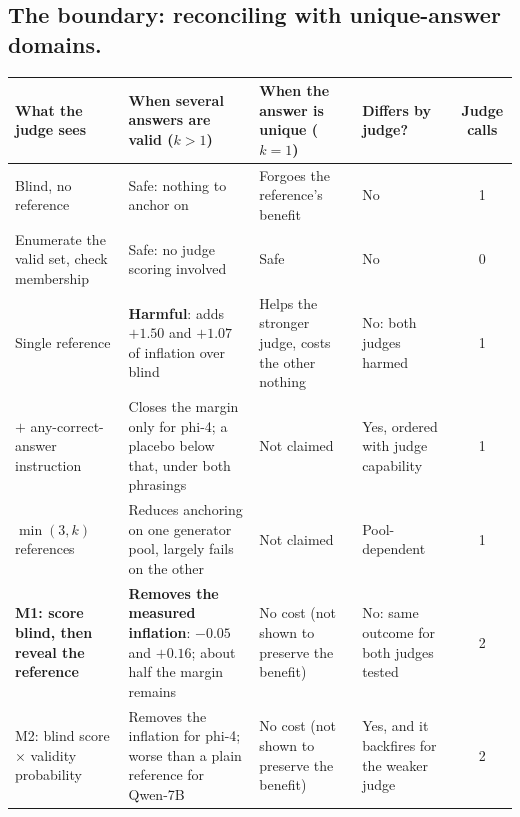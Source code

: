 \documentclass[11pt]{article}
\begin{document}
\FloatBarrier\subsection{The boundary: reconciling with unique-answer domains.}
\label{sec:boundary}

\begin{table}[tbp]
\centering
\footnotesize
\setlength{\tabcolsep}{3pt}
\begin{tabular}{L{3.3cm}L{4.3cm}L{2.6cm}L{2.6cm}c}
\toprule
What the judge sees & When several answers are valid ($k{>}1$) & When the answer is unique ($k{=}1$) & Differs by judge? & Judge calls \\
\midrule
Blind, no reference & Safe: nothing to anchor on & Forgoes the reference's benefit & No & 1 \\
\addlinespace
Enumerate the valid set, check membership & Safe: no judge scoring involved & Safe & No & 0 \\
\addlinespace
Single reference & \textbf{Harmful}: adds $+1.50$ and $+1.07$ of inflation over blind & Helps the stronger judge, costs the other nothing & No: both judges harmed & 1 \\
\addlinespace
$+$ any-correct-answer instruction & Closes the margin only for phi-4; a placebo below that, under both phrasings & Not claimed & Yes, ordered with judge capability & 1 \\
\addlinespace
$\min(3,k)$ references & Reduces anchoring on one generator pool, largely fails on the other & Not claimed & Pool-dependent & 1 \\
\addlinespace
\textbf{M1: score blind, then reveal the reference} & \textbf{Removes the measured inflation}: $-0.05$ and $+0.16$; about half the margin remains & No cost (not shown to preserve the benefit) & No: same outcome for both judges tested & 2 \\
\addlinespace
M2: blind score $\times$ validity probability & Removes the inflation for phi-4; worse than a plain reference for Qwen-7B & No cost (not shown to preserve the benefit) & Yes, and it backfires for the weaker judge & 2 \\
\bottomrule
\end{tabular}


\end{table}
\end{document}
